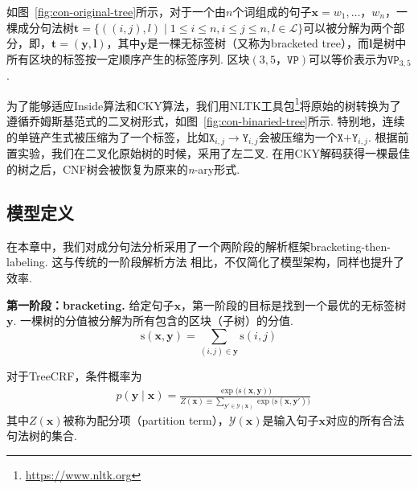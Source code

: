 如图~\ref{fig:con-original-tree}所示，对于一个由$n$个词组成的句子$\boldsymbol{x}=w_1,\dots，w_{n}$，一棵成分句法树$\boldsymbol{t}=\{((i, j),l)\mid 1\le i \le n,i \le j \le n,l \in \mathcal{L}\}$可以被分解为两个部分，即，$\boldsymbol{t}=(\boldsymbol{y}, \boldsymbol{l})$，其中$\boldsymbol{y}$是一棵无标签树（又称为bracketed tree），而$\boldsymbol{l}$是树中所有区块的标签按一定顺序产生的标签序列.
区块$(3,5，\texttt{VP})$可以等价表示为$\texttt{VP}_{3,5}$.

为了能够适应Inside算法和CKY算法，我们用NLTK工具包\footnote{\url{https://www.nltk.org}}将原始的树转换为了遵循乔姆斯基范式的二叉树形式，如图~\ref{fig:con-binaried-tree}所示.
特别地，连续的单链产生式被压缩为了一个标签，比如$\texttt{X}_{i,j} \rightarrow \texttt{Y}_{i,j}$会被压缩为一个$\texttt{X+Y}_{i,j}$.
根据前置实验，我们在二叉化原始树的时候，采用了左二叉.
在用CKY解码获得一棵最佳的树之后，CNF树会被恢复为原来的\textit{n}-ary形式.

\subsection{模型定义}\label{sub@sec:con-crf-model-definition}

在本章中，我们对成分句法分析采用了一个两阶段的解析框架bracketing-then-labeling.
这与传统的一阶段解析方法 \citep{stern-etal-2017-minimal,gaddy-etal-2018-whats}相比，不仅简化了模型架构，同样也提升了效率.

\noindent\textbf{第一阶段：bracketing.}
给定句子$\boldsymbol{x}$，第一阶段的目标是找到一个最优的无标签树$\boldsymbol{y}$.
一棵树的分值被分解为所有包含的区块（子树）的分值.
\begin{equation} \label{eq:tree-score}
	\mathrm{s}(\boldsymbol{x},\boldsymbol{y}) = \sum\limits_{(i,j)\in \boldsymbol{y}}\mathrm{s}(i,j)
\end{equation}

对于TreeCRF，条件概率为
\begin{equation}\label{eq:tree-prob}
	\begin{split}
		& p(\boldsymbol{y}\mid\boldsymbol{x})  = \frac{\exp({\mathrm{s}(\boldsymbol{x},\boldsymbol{y}))}}{Z(\boldsymbol{x}) \equiv \sum\limits_{\boldsymbol{y'} \in \mathcal{Y}(\boldsymbol{x})} {\exp({\mathrm{s}(\boldsymbol{x},\boldsymbol{y'}))}}}
	\end{split}
\end{equation}
其中$Z(\boldsymbol{x})$被称为配分项（partition term），$\mathcal{Y}(\boldsymbol{x})$是输入句子$\boldsymbol{x}$对应的所有合法句法树的集合.

